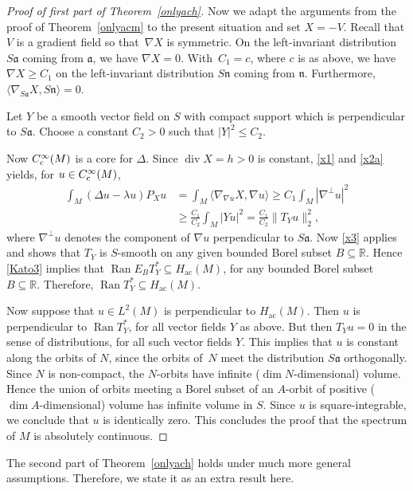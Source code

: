 \documentclass[pdftex]{sigma}
\numberwithin{equation}{section}
\DeclareMathOperator{\diver}{div}
\DeclareMathOperator{\ran}{Ran}
\def\ac{\mathrm{ac}}
\def\R{\mathbb R}
\begin{document}
\begin{proof}[Proof of first part of Theorem~\ref{onlyach}]
Now we adapt the arguments from the proof of Theorem~\ref{onlyacm} to the present situation and set $X=-V$.
Recall that $V$ is a gradient field so that~$\nabla X$ is symmetric.
On the left-invariant distribution $S\mathfrak a$ coming from $\mathfrak a$, we have $\nabla X=0$.
With~$C_1=c$, where $c$ is as above, we have $\nabla X\ge C_1$
on the left-invariant distribution $S\mathfrak n$ coming from $\mathfrak n$.
Furthermore, $\langle\nabla_{S\mathfrak a}X,S\mathfrak n\rangle=0$.

Let $Y$ be a smooth vector field on $S$ with compact support which is perpendicular to $S\mathfrak a$.
Choose a constant $C_2>0$ such that $|Y|^2\le C_2$.

Now $C^\infty_{\rm c}(M)$ is a core for $\Delta$.
Since $\diver X=h>0$ is constant, \eqref{x1} and \eqref{x2a} yields, for $u\in C^\infty_{\rm c}(M)$,
\begin{align*}
 \int_M (\Delta u-\lambda u) P_Xu
 &= \int_M \langle\nabla_{\nabla u}X,\nabla u\rangle \ge C_1 \int_M|\nabla^\bot u|^2 \\
 &\ge \frac{C_1}{C_2}\int_M|Yu|^2 = \frac{C_1}{C_2}\|T_Yu\|_2^2,
\end{align*}
where $\nabla^\bot u$ denotes the component of $\nabla u$ perpendicular to $S\mathfrak a$.
Now \eqref{x3} applies and shows that $T_Y$ is $S$-smooth on any given bounded Borel subset $B\subseteq\R$.
Hence \eqref{Kato3} implies that $\ran E_BT_Y^*\subseteq H_{\ac}(M)$,
for any bounded Borel subset $B\subseteq\R$.
Therefore, $\ran T_Y^*\subseteq H_{\ac}(M)$.

Now suppose that $u\in L^2(M)$ is perpendicular to $H_{\ac}(M)$.
Then $u$ is perpendicular to $\ran T_Y^*$, for all vector fields $Y$ as above.
But then $T_Yu=0$ in the sense of distributions, for all such vector fields $Y$.
This implies that $u$ is constant along the orbits of $N$,
since the orbits of~$N$ meet the distribution $S\mathfrak a$ orthogonally.
Since $N$ is non-compact, the $N$-orbits have infinite ($\dim N$-dimensional) volume.
Hence the union of orbits meeting a Borel subset of an $A$-orbit of positive ($\dim A$-dimensional) volume
has infinite volume in $S$.
Since $u$ is square-integrable, we conclude that $u$ is identically zero.
This concludes the proof that the spectrum of $M$ is absolutely continuous.
\end{proof}

The second part of Theorem~\ref{onlyach} holds under much more general assumptions.
Therefore, we state it as an extra result here.
\end{document}
